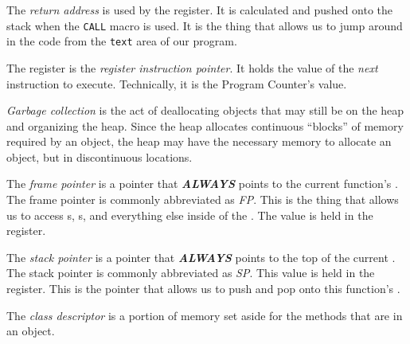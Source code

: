 \begin{definition}\label{def:Return_Address}
  The \emph{return address} is used by the \ripRegister{} register.
  It is calculated and pushed onto the  stack when the \texttt{CALL} macro is used.
  It is the thing that allows us to jump around in the code from the \texttt{text} area of our program.

  \begin{remark}
    The \ripRegister{} register is the \emph{register instruction pointer}.
    It holds the value of the \emph{next} instruction to execute.
    Technically, it is the Program Counter's value.
  \end{remark}
\end{definition}

\begin{definition}\label{def:Garbage_Collection}
  \emph{Garbage collection} is the act of deallocating objects that may still be on the heap and organizing the heap.
  Since the heap allocates continuous ``blocks'' of memory required by an object, the heap may have the necessary memory to allocate an object, but in discontinuous locations.
\end{definition}

\begin{definition}\label{def:Frame_Pointer}
  The \emph{frame pointer} is a pointer that \textbf{\emph{ALWAYS}} points to the current function's .
  The frame pointer is commonly abbreviated as \emph{FP}.
  This is the thing that allows us to access s, s, and everything else inside of the .
  The value is held in the \rbpRegister{} register.
\end{definition}

\begin{definition}\label{def:Stack_Pointer}
  The \emph{stack pointer} is a pointer that \textbf{\emph{ALWAYS}} points to the top of the current .
  The stack pointer is commonly abbreviated as \emph{SP}.
  This value is held in the \rspRegister{} register.
  This is the pointer that allows us to push and pop onto this function's .
\end{definition}

\begin{definition}\label{def:Class_Descriptor}
  The \emph{class descriptor} is a portion of memory set aside for the methods that are in an object.
\end{definition}


